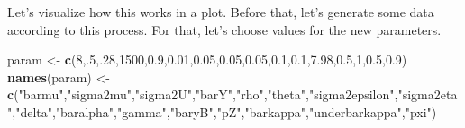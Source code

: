 \documentclass[]{book}
\newenvironment{Shaded}{\begin{snugshade}}{\end{snugshade}}
\newcommand{\DecValTok}[1]{\textcolor[rgb]{0.00,0.00,0.81}{#1}}
\newcommand{\FloatTok}[1]{\textcolor[rgb]{0.00,0.00,0.81}{#1}}
\newcommand{\KeywordTok}[1]{\textcolor[rgb]{0.13,0.29,0.53}{\textbf{#1}}}
\newcommand{\NormalTok}[1]{#1}
\newcommand{\StringTok}[1]{\textcolor[rgb]{0.31,0.60,0.02}{#1}}
\theoremstyle{definition}
\theoremstyle{definition}
\theoremstyle{definition}
\theoremstyle{remark}
\begin{document}
Let's visualize how this works in a plot.
Before that, let's generate some data according to this process.
For that, let's choose values for the new parameters.

\begin{Shaded}
\begin{Highlighting}[]
\NormalTok{param <-}\StringTok{ }\KeywordTok{c}\NormalTok{(}\DecValTok{8}\NormalTok{,.}\DecValTok{5}\NormalTok{,.}\DecValTok{28}\NormalTok{,}\DecValTok{1500}\NormalTok{,}\FloatTok{0.9}\NormalTok{,}\FloatTok{0.01}\NormalTok{,}\FloatTok{0.05}\NormalTok{,}\FloatTok{0.05}\NormalTok{,}\FloatTok{0.05}\NormalTok{,}\FloatTok{0.1}\NormalTok{,}\FloatTok{0.1}\NormalTok{,}\FloatTok{7.98}\NormalTok{,}\FloatTok{0.5}\NormalTok{,}\DecValTok{1}\NormalTok{,}\FloatTok{0.5}\NormalTok{,}\FloatTok{0.9}\NormalTok{)}
\KeywordTok{names}\NormalTok{(param) <-}\StringTok{ }\KeywordTok{c}\NormalTok{(}\StringTok{"barmu"}\NormalTok{,}\StringTok{"sigma2mu"}\NormalTok{,}\StringTok{"sigma2U"}\NormalTok{,}\StringTok{"barY"}\NormalTok{,}\StringTok{"rho"}\NormalTok{,}\StringTok{"theta"}\NormalTok{,}\StringTok{"sigma2epsilon"}\NormalTok{,}\StringTok{"sigma2eta"}\NormalTok{,}\StringTok{"delta"}\NormalTok{,}\StringTok{"baralpha"}\NormalTok{,}\StringTok{"gamma"}\NormalTok{,}\StringTok{"baryB"}\NormalTok{,}\StringTok{"pZ"}\NormalTok{,}\StringTok{"barkappa"}\NormalTok{,}\StringTok{"underbarkappa"}\NormalTok{,}\StringTok{"pxi"}\NormalTok{)}
\end{Highlighting}
\end{Shaded}
\end{document}
